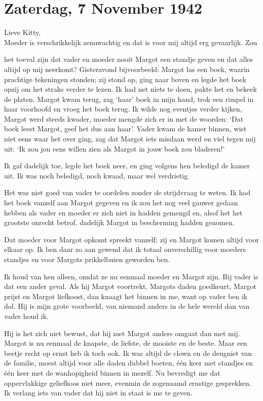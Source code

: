 \documentclass{book}
\begin{document}
\chapter{Zaterdag, 7 November 1942}

Lieve Kitty,\\Moeder is verschrikkelijk zenuwachtig en dat is voor mij
altijd erg gevaarlijk. Zou

het toeval zijn dat vader en moeder nooit Margot een standje geven en
dat alles altijd op mij neerkomt? Gisteravond bijvoorbeeld: Margot las
een boek, waarin prachtige tekeningen stonden; zij stond op, ging naar
boven en legde het boek opzij om het straks verder te lezen. Ik had net
niets te doen, pakte het en bekeek de platen. Margot kwam terug, zag
`haar' boek in mijn hand, trok een rimpel in haar voorhoofd en vroeg het
boek terug. Ik wilde nog eventjes verder kijken, Margot werd steeds
kwader, moeder mengde zich er in met de woorden: `Dat boek leest Margot,
geef het dus aan haar'. Vader kwam de kamer binnen, wist niet eens waar
het over ging, zag dat Margot iets misdaan werd en viel tegen mij uit:
`Ik zou jou eens willen zien als Margot in jouw boek zou bladeren!'

Ik gaf dadelijk toe, legde het boek neer, en ging volgens hen beledigd
de kamer uit. Ik was noch beledigd, noch kwaad, maar wel verdrietig.

Het was niet goed van vader te oordelen zonder de strijdvraag te weten.
Ik had het boek vanzelf aan Margot gegeven en ik zou het nog veel gauwer
gedaan hebben als vader en moeder er zich niet in hadden gemengd en,
alsof het het grootste onrecht betrof, dadelijk Margot in bescherming
hadden genomen.

Dat moeder voor Margot opkomt spreekt vanzelf; zij en Margot komen
altijd voor elkaar op. Ik ben daar zo aan gewend dat ik totaal
onverschillig voor moeders standjes en voor Margots prikkelbuien
geworden ben.

Ik houd van hen alleen, omdat ze nu eenmaal moeder en Margot zijn. Bij
vader is dat een ander geval. Als hij Margot voortrekt, Margots daden
goedkeurt, Margot prijst en Margot liefkoost, dan knaagt het binnen in
me, want op vader ben ik dol. Hij is mijn grote voorbeeld, van niemand
anders in de hele wereld dan van vader houd ik.

Hij is het zich niet bewust, dat hij met Margot anders omgaat dan met
mij. Margot is nu eenmaal de knapste, de liefste, de mooiste en de
beste. Maar een beetje recht op ernst heb ik toch ook. Ik was altijd de
clown en de deugniet van de familie, moest altijd voor alle daden dubbel
boeten, één keer met standjes en één keer met de wanhopigheid binnen in
mezelf. Nu bevredigt me dat oppervlakkige geliefkoos niet meer, evenmin
de zogenaamd ernstige gesprekken. Ik verlang iets van vader dat hij niet
in staat is me te geven.
\end{document}
